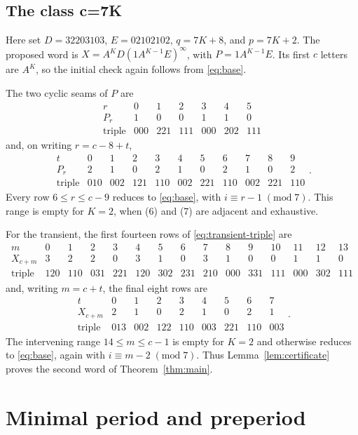 \documentclass[11pt]{article}
\begin{document}
\subsection{The class c=7K}

Here set $D=32203103$, $E=02102102$, $q=7K+8$, and $p=7K+2$.
The proposed word is $X=A^KD(1A^{K-1}E)^\infty$, with
$P=1A^{K-1}E$.  Its first $c$ letters are $A^K$, so the initial check again
follows from \eqref{eq:base}.

The two cyclic seams of $P$ are
\[
\begin{array}{c|rrrrrr}
r&0&1&2&3&4&5\\ \hline
P_r&1&0&0&1&1&0\\
\text{triple}&000&221&111&000&202&111
\end{array}
\]
and, on writing $r=c-8+t$,
\[
\begin{array}{c|rrrrrrrrrr}
t&0&1&2&3&4&5&6&7&8&9\\ \hline
P_r&2&1&0&2&1&0&2&1&0&2\\
\text{triple}&010&002&121&110&002&221&110&002&221&110
\end{array}.
\]
Every row $6\le r\le c-9$ reduces to \eqref{eq:base}, with
$i\equiv r-1\;(\mathrm{mod}\;7)$.  This range is empty for $K=2$, when (6) and (7) are
adjacent and exhaustive.

For the transient, the first fourteen rows of
\eqref{eq:transient-triple} are
\[
\begin{array}{c|rrrrrrrrrrrrrr}
m&0&1&2&3&4&5&6&7&8&9&10&11&12&13\\ \hline
X_{c+m}&3&2&2&0&3&1&0&3&1&0&0&1&1&0\\
\text{triple}&120&110&031&221&120&302&231&210&000&331&111&000&302&111
\end{array}
\]
and, writing $m=c+t$, the final eight rows are
\[
\begin{array}{c|rrrrrrrr}
t&0&1&2&3&4&5&6&7\\ \hline
X_{c+m}&2&1&0&2&1&0&2&1\\
\text{triple}&013&002&122&110&003&221&110&003
\end{array}.
\]
The intervening range $14\le m\le c-1$ is empty for $K=2$ and otherwise
reduces to \eqref{eq:base}, again with $i\equiv m-2\;(\mathrm{mod}\;7)$.  Thus
Lemma~\ref{lem:certificate} proves the second word of
Theorem~\ref{thm:main}.

\section{Minimal period and preperiod}
\end{document}
